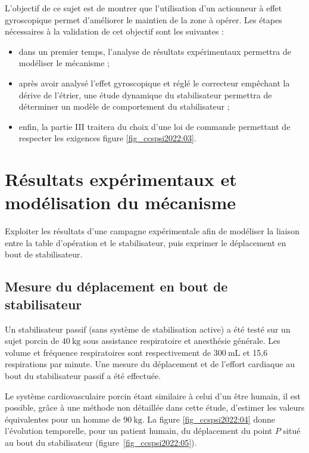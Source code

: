\begin{obj}
L'objectif de ce sujet est de montrer que l'utilisation d'un actionneur à effet gyroscopique permet d'améliorer le maintien de la zone à opérer. Les étapes nécessaires à la validation de cet objectif sont les suivantes :
\end{obj}

\begin{itemize}
  \item dans un premier temps, l'analyse de résultats expérimentaux permettra de modéliser le mécanisme ;

  \item après avoir analysé l'effet gyroscopique et réglé le correcteur empêchant la dérive de l'étrier, une étude dynamique du stabilisateur permettra de déterminer un modèle de comportement du stabilisateur ;

  \item enfin, la partie III traitera du choix d'une loi de commande permettant de respecter les exigences figure \ref{fig_ccspsi2022:03}.

\end{itemize}

\section{Résultats expérimentaux et modélisation du mécanisme}
\begin{obj}
Exploiter les résultats d'une campagne expérimentale afin de modéliser la liaison entre la table d'opération et le stabilisateur, puis exprimer le déplacement en bout de stabilisateur.
\end{obj}

\subsection{\label{sec:I.A} Mesure du déplacement en bout de stabilisateur}
Un stabilisateur passif (sans système de stabilisation active) a été testé sur un sujet porcin de $40 \mathrm{~kg}$ sous assistance respiratoire et anesthésie générale. Les volume et fréquence respiratoires sont respectivement de $300 \mathrm{~mL}$ et 15,6 respirations par minute. Une mesure du déplacement et de l'effort cardiaque au bout du stabilisateur passif a été effectuée.

Le système cardiovasculaire porcin étant similaire à celui d'un être humain, il est possible, grâce à une méthode non détaillée dans cette étude, d'estimer les valeurs équivalentes pour un homme de $90 \mathrm{~kg}$. La figure \ref{fig_ccspsi2022:04} donne l'évolution temporelle, pour un patient humain, du déplacement du point $P$ situé au bout du stabilisateur (figure~\ref{fig_ccspsi2022:05}).

